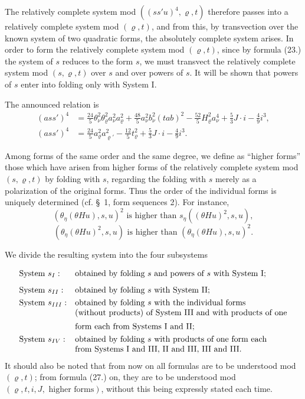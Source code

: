 \documentclass[11pt]{article}
\begin{document}
The relatively complete system mod $((ss'u)^4,\varrho,t)$ therefore passes into a relatively complete system mod $(\varrho,t)$, and from this, by transvection over the known system of two quadratic forms, the absolutely complete system arises. In order to form the relatively complete system mod $(\varrho,t)$, since by formula (23.) the system of $s$ reduces to the form $s$, we must transvect the relatively complete system mod $(s,\varrho,t)$ over $s$ and over powers of $s$. It will be shown that powers of $s$ enter into folding only with System I.

The announced relation is
\[
\tag{22}
\begin{aligned}
(ass')^4&=\frac{24}{5}\theta_\nu^2\theta_\varrho^2a_\nu^2a_\varrho^2+
\frac{48}{5}a_\nu^2b_\nu^2(tab)^2-
\frac{52}{5}H_\varrho^2a_\nu^4+
\frac53J\cdot i-\frac49i^3,\\
(ass')^4&=\frac{24}{5}a_\varrho^2a_{\varrho'}^2-
\frac{12}{5}t_\varrho^2+\frac53J\cdot i-\frac49i^3.
\end{aligned}
\]

Among forms of the same order and the same degree, we define as ``higher forms'' those which have arisen from higher forms of the relatively complete system mod $(s,\varrho,t)$ by folding with $s$, regarding the folding with $s$ merely as a polarization of the original forms. Thus the order of the individual forms is uniquely determined (cf. \S\ 1, form sequences 2). For instance,
\[
(\theta_\eta(\theta Hu),s,u)^2\text{ is higher than }s_\eta((\theta Hu)^2,s,u),
\]
\[
(\theta_\eta(\theta Hu)^2,s,u)\text{ is higher than }(\theta_\eta(\theta Hu),s,u)^2.
\]

We divide the resulting system into the four subsystems
\[
\begin{array}{ll}
\text{System }s_I:&\text{obtained by folding }s\text{ and powers of }s\text{ with System I;}\vphantom{\dfrac11}\\
\text{System }s_{II}:&\text{obtained by folding }s\text{ with System II;}\vphantom{\dfrac11}\\
\text{System }s_{III}:&\text{obtained by folding }s\text{ with the individual forms}\\
&\text{(without products) of System III and with products of one}\\
&\text{form each from Systems I and II;}\vphantom{\dfrac11}\\
\text{System }s_{IV}:&\text{obtained by folding }s\text{ with products of one form each}\\
&\text{from Systems I and III, II and III, III and III.}
\end{array}
\]
It should also be noted that from now on all formulas are to be understood mod $(\varrho,t)$; from formula (27.) on, they are to be understood mod $(\varrho,t,i,J,\text{ higher forms})$, without this being expressly stated each time.
\end{document}
